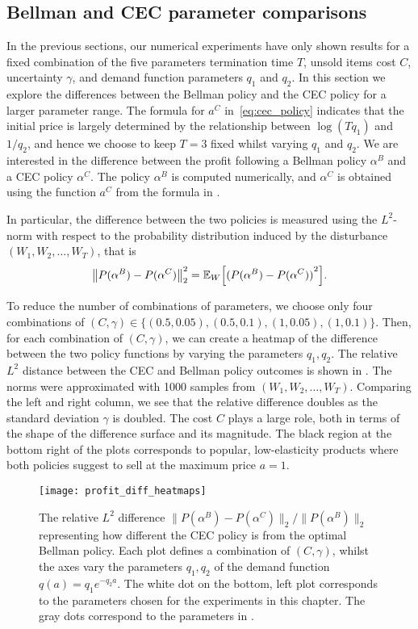 \documentclass[main.tex]{subfiles}
\begin{document}
\subsection{Bellman and CEC parameter comparisons}\label{sec:parameter_comparison}
In the previous sections, our numerical experiments have only shown
results for a fixed combination of the five parameters
termination time $T$, unsold items cost $C$, uncertainty $\gamma$, and
demand function parameters $q_1$ and $q_2$.
In this section we explore the differences between the Bellman policy
and the CEC policy for a larger parameter range.
The formula for $a^C$ in~\eqref{eq:cec_policy} indicates that the
initial price is largely determined by the relationship between
$\log(Tq_1)$ and $1/q_2$, and hence we choose to keep $T=3$ fixed whilst
varying $q_1$ and $q_2$.
We are interested in the difference between the profit following
a Bellman policy $\alpha^B$ and a CEC policy $\alpha^C$.
The policy $\alpha^B$ is computed numerically, and
$\alpha^C$ is obtained using the function $a^C$ from
the formula in .

In particular, the difference between the two policies is measured
using the $L^2$-norm with respect to the probability distribution
induced by the disturbance $(W_1,W_2,\dots,W_T)$, that is
\begin{equation}
  {\left\|P(\alpha^B)-P(\alpha^C)\right\|}_2^2
  =\mathbb{E}_W\Bigl[{( P(\alpha^B)-P(\alpha^C) )}^2 \Bigr].
\end{equation}

To reduce the number of combinations of parameters, we choose only
four combinations of
$(C,\gamma)\in\{(0.5,0.05),(0.5,0.1),(1,0.05),(1,0.1)\}$.
Then,
for each combination of $(C,\gamma)$,
we can create a heatmap of the difference between the two policy
functions by varying the parameters $q_1,q_2$.
The relative $L^2$ distance between the CEC and Bellman policy outcomes
is shown in . The norms were approximated
with \num{1000} samples from $(W_1,W_2,\dots,W_T)$.
Comparing the left and right column, we see that the relative difference doubles as
the standard deviation $\gamma$ is doubled. The cost $C$ plays a large
role, both in terms of the shape of the difference surface and its
magnitude.
The black region at the bottom right of the plots corresponds to popular,
low-elasticity products where both policies suggest to sell at the
maximum price $a=1$.
\begin{figure}[htbp]
  \texttt{[image: profit\_diff\_heatmaps]}
  \caption[Relative profit $L^2$ difference between the CEC and
  Bellman policies.]{The relative $L^2$ difference
    $\|P(\alpha^B)-P(\alpha^C)\|_2/\|P(\alpha^B)\|_2$ representing
    how different the CEC policy is from the optimal Bellman policy.
    Each plot defines a combination of $(C,\gamma)$, whilst
    the axes vary the parameters $q_1,q_2$ of the demand function
    $q(a)=q_1e^{-q_2a}$.
    The white dot on the bottom, left plot corresponds to the
    parameters chosen for the experiments in this chapter. The gray
    dots correspond to the parameters in .
  }\label{fig:profit_diff_heatmaps}
\end{figure}
\end{document}
